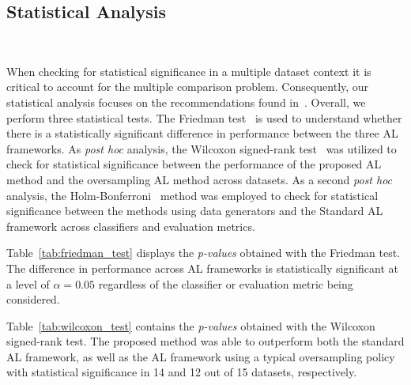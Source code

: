\documentclass[10pt,journal,compsoc]{IEEEtran}
\begin{document}
\subsection{Statistical Analysis}~\label{sec:statistical-analysis}

When checking for statistical significance in a multiple dataset context it is
critical to account for the multiple comparison problem. Consequently, our
statistical analysis focuses on the recommendations found
in~\cite{Demsar2006}. Overall, we perform three statistical tests. The
Friedman test~\cite{Friedman1937} is used to understand whether there is a
statistically significant difference in performance between the three AL
frameworks. As \textit{post hoc} analysis, the Wilcoxon signed-rank
test~\cite{Wilcoxon1945} was utilized to check for statistical significance
between the performance of the proposed AL method and the oversampling AL
method across datasets. As a second \textit{post hoc} analysis, the
Holm-Bonferroni~\cite{Holm1979} method was employed to check for statistical
significance between the methods using data generators and the Standard AL
framework across classifiers and evaluation metrics.
 
Table~\ref{tab:friedman_test} displays the \textit{p-values} obtained with the
Friedman test. The difference in performance across AL frameworks is
statistically significant at a level of $\alpha = 0.05$ regardless of the
classifier or evaluation metric being considered.

\begin{table}
	\centering
    \caption{%
        Friedman test results. Statistical significance is tested at a level
        of $\alpha = 0.05$. The null hypothesis is that there is no difference
        in the classification outcome across oversamplers.
    }\label{tab:friedman_test}
\end{table}

Table~\ref{tab:wilcoxon_test} contains the \textit{p-values} obtained with the
Wilcoxon signed-rank test. The proposed method was able to outperform both the
standard AL framework, as well as the AL framework using a typical
oversampling policy with statistical significance in 14 and 12 out of 15
datasets, respectively.

\begin{table}
	\centering
    \caption{%
        Adjusted p-values using the Wilcoxon signed-rank method. Bold values
        are statistically significant at a level of $\alpha = 0.05$. The null
        hypothesis is that the performance of the proposed framework is
        similar to that of the oversampling or standard framework.
    }\label{tab:wilcoxon_test}
\end{table}
\end{document}
